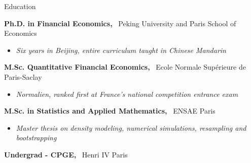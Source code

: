 \documentclass[usegeometry, 10pt, a4paper]{cv} %
\newcommand{\activite}[1]{\textbf{#1}\ }
\begin{document}
\begin{rubriquetableau}[0.95\textwidth]{Education}\\
\vspace{-0.5cm}

\activite{Ph.D. in Financial Economics,} Peking University and Paris School of Economics\\
\vspace{-0.8cm}  
\begin{itemize}[label={},
  rightmargin=\dimexpr\linewidth-13cm-\leftmargin\relax]
\item \small{\emph{Six years in Beijing, entire curriculum taught in Chinese Mandarin}}
\end{itemize}

\vspace{0.2cm}

\activite{M.Sc. Quantitative Financial Economics,} Ecole Normale Supérieure
de Paris-Saclay \\
\vspace{-0.3cm}
\begin{itemize}[label={}, rightmargin=\dimexpr\linewidth-13cm-\leftmargin\relax]
\item \small{\emph{Normalien, ranked first at France's national competition entrance exam}}
\end{itemize}

\vspace{0.2cm}


\activite{M.Sc. in Statistics and Applied Mathematics,} ENSAE Paris\\
\vspace{-0.3cm}
\begin{itemize}[label={}, rightmargin=\dimexpr\linewidth-13cm-\leftmargin\relax]
\item \small{\emph{Master thesis on density modeling, numerical simulations, resampling and bootstrapping}}
\end{itemize}

\activite{Undergrad - CPGE,} Henri IV Paris
\end{rubriquetableau}
\end{document}
